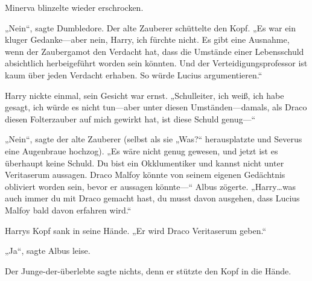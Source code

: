 Minerva blinzelte wieder erschrocken.

„Nein“, sagte Dumbledore. Der alte Zauberer schüttelte den Kopf. „Es war ein kluger Gedanke—aber nein, Harry, ich fürchte nicht. Es gibt eine Ausnahme, wenn der Zaubergamot den Verdacht hat, dass die Umstände einer Lebensschuld absichtlich herbeigeführt worden sein könnten. Und der Verteidigungsprofessor ist kaum über jeden Verdacht erhaben. So würde Lucius argumentieren.“

Harry nickte einmal, sein Gesicht war ernst. „Schulleiter, ich weiß, ich habe gesagt, ich würde es nicht tun—aber unter diesen Umständen—damals, als Draco diesen Folterzauber auf mich gewirkt hat, ist diese Schuld genug—“

„Nein“, sagte der alte Zauberer (selbst als sie „Was?“ herausplatzte und Severus eine Augenbraue hochzog). „Es wäre nicht genug gewesen, und jetzt ist es überhaupt keine Schuld. Du bist ein Okklumentiker und kannst nicht unter Veritaserum aussagen. Draco Malfoy könnte von seinem eigenen Gedächtnis obliviert worden sein, bevor er aussagen könnte—“ Albus zögerte. „Harry…was auch immer du mit Draco gemacht hast, du musst davon ausgehen, dass Lucius Malfoy bald davon erfahren wird.“

Harrys Kopf sank in seine Hände. „Er wird Draco Veritaserum geben.“

„Ja“, sagte Albus leise.

Der Junge-der-überlebte sagte nichts, denn er stützte den Kopf in die Hände.

